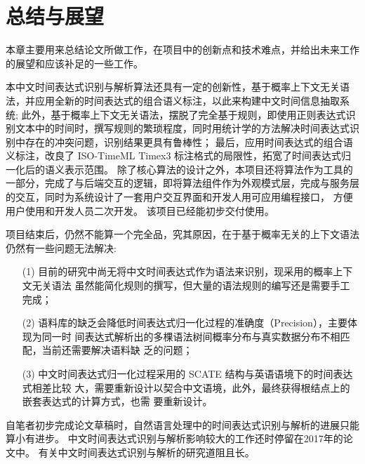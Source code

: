 
\chapter{总结与展望}

本章主要用来总结论文所做工作，在项目中的创新点和技术难点，并给出未来工作的展望和应该补足的一些工作。

本中文时间表达式识别与解析算法还具有一定的创新性，基于概率上下文无关语法，并应用全新的时间表达式的组合语义标注，以此来构建中文时间信息抽取系统;
此外，基于概率上下文无关语法，摆脱了完全基于规则，即使用正则表达式识别文本中的时间时，撰写规则的繁琐程度，同时用统计学的方法解决时间表达式识别中存在的冲突问题，识别结果更具有鲁棒性；
最后，应用时间表达式的组合语义标注，改良了 ISO-TimeML Timex3 标注格式的局限性，拓宽了时间表达式归一化后的语义表示范围。
除了核心算法的设计之外，本项目还将算法作为工具的一部分，完成了与后端交互的逻辑，即将算法组件作为外观模式层，完成与服务层的交互，同时为系统设计了一套用户交互界面和开发人用可应用编程接口，
方便用户使用和开发人员二次开发。 该项目已经能初步交付使用。

项目结束后，仍然不能算一个完全品，究其原因，在于基于概率无关的上下文语法仍然有一些问题无法解决:
\begin{enumerate}
    \item[(1)] 目前的研究中尚无将中文时间表达式作为语法来识别，现采用的概率上下文无关语法
    虽然能简化规则的撰写，但大量的语法规则的编写还是需要手工完成；
    \item[(2)] 语料库的缺乏会降低时间表达式归一化过程的准确度（Precision），主要体现为同一时
    间表达式解析出的多棵语法树间概率分布与真实数据分布不相匹配，当前还需要解决语料缺
    乏的问题；
    \item[(3)] 中文时间表达式归一化过程采用的 SCATE 结构与英语语境下的时间表达式相差比较
    大，需要重新设计以契合中文语境，此外，最终获得根结点上的嵌套表达式的计算方式，也需
    要重新设计。
\end{enumerate}

自笔者初步完成论文草稿时，自然语言处理中的时间表达式识别与解析的进展只能算小有进步。
中文时间表达式识别与解析影响较大的工作还时停留在2017年的论文中。 有关中文时间表达式识别与解析的研究道阻且长。
